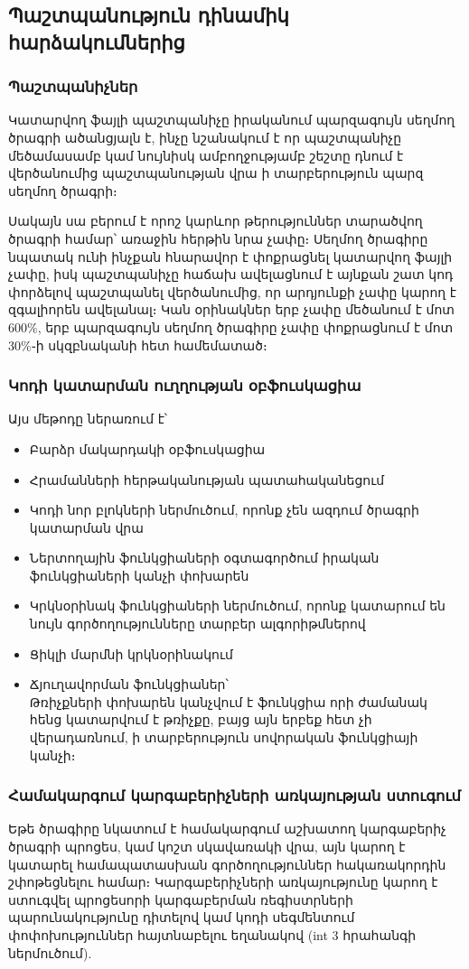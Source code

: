 \documentclass[12pt]{article}
\begin{document}
\begin{sloppypar}
\subsection{Պաշտպանություն դինամիկ հարձակումներից}

\subsubsection{Պաշտպանիչներ}
Կատարվող ֆայլի պաշտպանիչը իրականում պարզագույն սեղմող ծրագրի ածանցյալն է,
ինչը նշանակում է որ պաշտպանիչը մեծամասամբ կամ նույնիսկ ամբողջությամբ
շեշտը դնում է վերծանումից պաշտպանության վրա ի տարբերություն պարզ սեղմող
ծրագրի։

Սակայն սա բերում է որոշ կարևոր թերություններ տարածվող ծրագրի համար՝
առաջին հերթին նրա չափը։ Սեղմող ծրագիրը նպատակ ունի ինչքան հնարավոր է փոքրացնել
կատարվող ֆայլի չափը, իսկ պաշտպանիչը հաճախ ավելացնում է այնքան շատ կոդ
փորձելով պաշտպանել վերծանումից, որ արդյունքի չափը կարող է զգալիորեն
ավելանալ։ Կան օրինակներ երբ չափը մեծանում է մոտ 600\%, երբ պարզագույն սեղմող
ծրագիրը չափը փոքրացնում է մոտ 30\%֊ի սկզբնականի հետ համեմատած։

\subsubsection{Կոդի կատարման ուղղության օբֆուսկացիա}
Այս մեթոդը ներառում է՝
\begin{itemize}
\item Բարձր մակարդակի օբֆուսկացիա
\item Հրամանների հերթականության պատահականեցում
\item Կոդի նոր բլոկների ներմուծում, որոնք չեն ազդում ծրագրի կատարման վրա
\item Ներտողային ֆունկցիաների օգտագործում իրական ֆունկցիաների կանչի փոխարեն
\item Կրկնօրինակ ֆունկցիաների ներմուծում, որոնք կատարում են նույն
	գործողությունները տարբեր ալգորիթմներով
\item Ցիկլի մարմնի կրկնօրինակում
\item Ճյուղավորման ֆունկցիաներ՝\\
	Թռիչքների փոխարեն կանչվում է ֆունկցիա որի ժամանակ հենց կատարվում է
	թռիչքը, բայց այն երբեք հետ չի վերադառնում, ի տարբերություն սովորական
	ֆունկցիայի կանչի։
\end{itemize}

\subsubsection{Համակարգում կարգաբերիչների առկայության ստուգում}
Եթե ծրագիրը նկատում է համակարգում աշխատող կարգաբերիչ ծրագրի պրոցես, կամ
կոշտ սկավառակի վրա, այն կարող է կատարել համապատասխան գործողություններ
հակառակորդին շփոթեցնելու համար։ Կարգաբերիչների առկայությունը կարող է
ստուգվել պրոցեսորի կարգաբերման ռեգիստրների պարունակությունը դիտելով
կամ կոդի սեգմենտում փոփոխություններ հայտնաբելու եղանակով (int 3 հրահանգի
ներմուծում).


\end{sloppypar}
\end{document}
